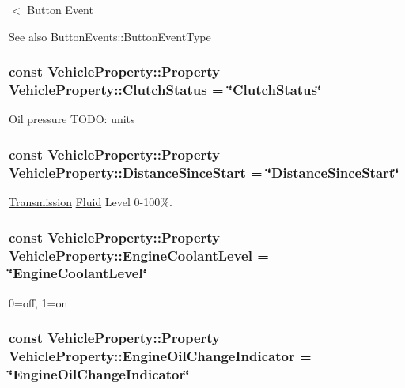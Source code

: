 $<$ Button Event \begin{DoxySeeAlso}{See also}
Button\+Events\+::\+Button\+Event\+Type 
\end{DoxySeeAlso}
\hypertarget{classVehicleProperty_acdca2ca718fd392c7ad9b8adc817baec}{
\subsubsection[{Clutch\+Status}]{\setlength{\rightskip}{0pt plus 5cm}const Vehicle\+Property\+::\+Property Vehicle\+Property\+::\+Clutch\+Status = \char`\"{}Clutch\+Status\char`\"{}\hspace{0.3cm}{\ttfamily [static]}}}\label{classVehicleProperty_acdca2ca718fd392c7ad9b8adc817baec}
Oil pressure T\+O\+D\+O\+: units \hypertarget{classVehicleProperty_a340253da4ce8dfac2b40f3ee27d9ed4b}{
\subsubsection[{Distance\+Since\+Start}]{\setlength{\rightskip}{0pt plus 5cm}const Vehicle\+Property\+::\+Property Vehicle\+Property\+::\+Distance\+Since\+Start = \char`\"{}Distance\+Since\+Start\char`\"{}\hspace{0.3cm}{\ttfamily [static]}}}\label{classVehicleProperty_a340253da4ce8dfac2b40f3ee27d9ed4b}
\hyperlink{interfaceTransmission}{Transmission} \hyperlink{interfaceFluid}{Fluid} Level 0-\/100\%. \hypertarget{classVehicleProperty_aac38e43b1c1ec7239252dfafe6d19d87}{
\subsubsection[{Engine\+Coolant\+Level}]{\setlength{\rightskip}{0pt plus 5cm}const Vehicle\+Property\+::\+Property Vehicle\+Property\+::\+Engine\+Coolant\+Level = \char`\"{}Engine\+Coolant\+Level\char`\"{}\hspace{0.3cm}{\ttfamily [static]}}}\label{classVehicleProperty_aac38e43b1c1ec7239252dfafe6d19d87}
0=off, 1=on \hypertarget{classVehicleProperty_a6d35870db03580d6e912fc49dd889bc7}{
\subsubsection[{Engine\+Oil\+Change\+Indicator}]{\setlength{\rightskip}{0pt plus 5cm}const Vehicle\+Property\+::\+Property Vehicle\+Property\+::\+Engine\+Oil\+Change\+Indicator = \char`\"{}Engine\+Oil\+Change\+Indicator\char`\"{}\hspace{0.3cm}{\ttfamily [static]}}}\label{classVehicleProperty_a6d35870db03580d6e912fc49dd889bc7}
